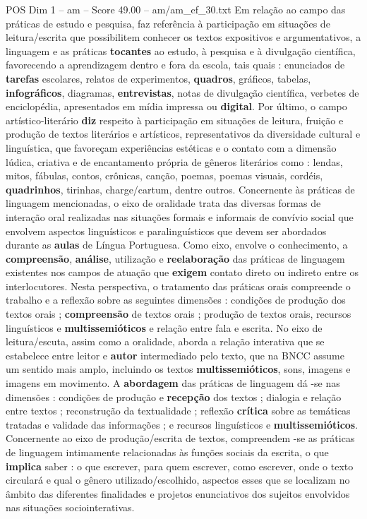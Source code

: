\begin{textsample}{POS Dim 1 – am – Score 49.00 – am/am\_ef\_30.txt}
Em relação ao campo das práticas de estudo e pesquisa, faz referência à participação em situações de leitura/escrita que possibilitem conhecer os textos expositivos e argumentativos, a linguagem e as práticas \textbf{tocantes} ao estudo, à pesquisa e à divulgação científica, favorecendo a aprendizagem dentro e fora da escola, tais quais : enunciados de \textbf{tarefas} escolares, relatos de experimentos, \textbf{quadros}, gráficos, tabelas, \textbf{infográficos}, diagramas, \textbf{entrevistas}, notas de divulgação científica, verbetes de enciclopédia, apresentados em mídia impressa ou \textbf{digital}.
Por último, o campo artístico-literário \textbf{diz} respeito à participação em situações de leitura, fruição e produção de textos literários e artísticos, representativos da diversidade cultural e linguística, que favoreçam experiências estéticas e o contato com a dimensão lúdica, criativa e de encantamento própria de gêneros literários como : lendas, mitos, fábulas, contos, crônicas, canção, poemas, poemas visuais, cordéis, \textbf{quadrinhos}, tirinhas, charge/cartum, dentre outros.
Concernente às práticas de linguagem mencionadas, o eixo de oralidade trata das diversas formas de interação oral realizadas nas situações formais e informais de convívio social que envolvem aspectos linguísticos e paralinguísticos que devem ser abordados durante as \textbf{aulas} de Língua Portuguesa.
Como eixo, envolve o conhecimento, a \textbf{compreensão}, \textbf{análise}, utilização e \textbf{reelaboração} das práticas de linguagem existentes nos campos de atuação que \textbf{exigem} contato direto ou indireto entre os interlocutores.
Nesta perspectiva, o tratamento das práticas orais compreende o trabalho e a reflexão sobre as seguintes dimensões : condições de produção dos textos orais ; \textbf{compreensão} de textos orais ; produção de textos orais, recursos linguísticos e \textbf{multissemióticos} e relação entre fala e escrita.
No eixo de leitura/escuta, assim como a oralidade, aborda a relação interativa que se estabelece entre leitor e \textbf{autor} intermediado pelo texto, que na BNCC assume um sentido mais amplo, incluindo os textos \textbf{multissemióticos}, sons, imagens e imagens em movimento.
A \textbf{abordagem} das práticas de linguagem dá -se nas dimensões : condições de produção e \textbf{recepção} dos textos ; dialogia e relação entre textos ; reconstrução da textualidade ; reflexão \textbf{crítica} sobre as temáticas tratadas e validade das informações ; e recursos linguísticos e \textbf{multissemióticos}.
Concernente ao eixo de produção/escrita de textos, compreendem -se as práticas de linguagem intimamente relacionadas às funções sociais da escrita, o que \textbf{implica} saber : o que escrever, para quem escrever, como escrever, onde o texto circulará e qual o gênero utilizado/escolhido, aspectos esses que se localizam no âmbito das diferentes finalidades e projetos enunciativos dos sujeitos envolvidos nas situações sociointerativas.

\end{textsample}
